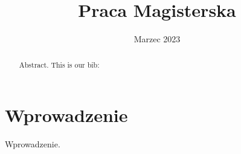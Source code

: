 \documentclass{pracamgr}
\title{Praca Magisterska}
\date{Marzec 2023}
\begin{document}
\maketitle

\begin{abstract}
    Abstract. This is our bib: \cite{latex2e}
\end{abstract}

\tableofcontents

\chapter{Wprowadzenie}
Wprowadzenie.

\printbibliography
\end{document}
